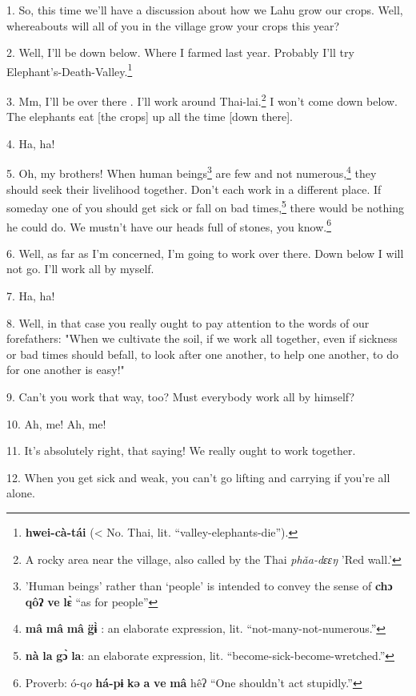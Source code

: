 \setcounter{footnote}{0}


1. So, this time we'll have a discussion about how we Lahu grow our crops. Well,
whereabouts will all of you in the village grow your crops this year?

2. Well, I'll be down below. Where I farmed last year. Probably I'll try Elephant's-Death-Valley.\footnote{\textbf{hwei-cà-tái} (< No. Thai, lit. ``valley-elephants-die'').}

3. Mm, I'll be over there . I'll work around Thai-lai.\footnote{A rocky area near the village, also called by the Thai \textit{phǎa-dɛɛŋ} 'Red wall.'}
I won't come down below. The elephants eat [the crops] up all the time [down there].

4. Ha, ha!

5. Oh, my brothers! When human beings\footnote{'Human beings' rather than `people' is intended to convey the sense of \textbf{chɔ} \textbf{qôʔ} \textbf{ve} \textbf{lɛ̀} ``as for people''} are few and not numerous,\footnote{\textbf{mâ} \textbf{mâ} \textbf{mâ} \textbf{g̈ɨ̀} : an elaborate expression, lit. ``not-many-not-numerous.''} they should
seek their livelihood together. Don't each work in a different place. If someday
one of you should get sick or fall on bad times,\footnote{\textbf{nà} \textbf{la} \textbf{gɔ̀} \textbf{la}: an elaborate expression, lit. ``become-sick-become-wretched.''} there would be nothing he could
do. We mustn't have our heads full of stones, you know.\footnote{Proverb: ó-q\textit{\emph{o}} \textbf{há-pɨ} \textbf{kə} \textbf{a} \textbf{ve} \textbf{mâ} hêʔ ``One shouldn't act stupidly.''}

6. Well, as far as I'm concerned, I'm going to work over there. Down below I will
not go. I'll work all by myself.

7. Ha, ha!

8. Well, in that case you really ought to pay attention to the words of our forefathers:
"When we cultivate the soil, if we work all together, even if sickness
or bad times should befall, to look after one another, to help one another, to
do for one another is easy!"

9. Can't you work that way, too? Must everybody work all by himself?

10. Ah, me! Ah, me!

11. It's absolutely right, that saying! We really ought to work together.

12. When you get sick and weak, you can't go lifting and carrying if you're all
alone.

